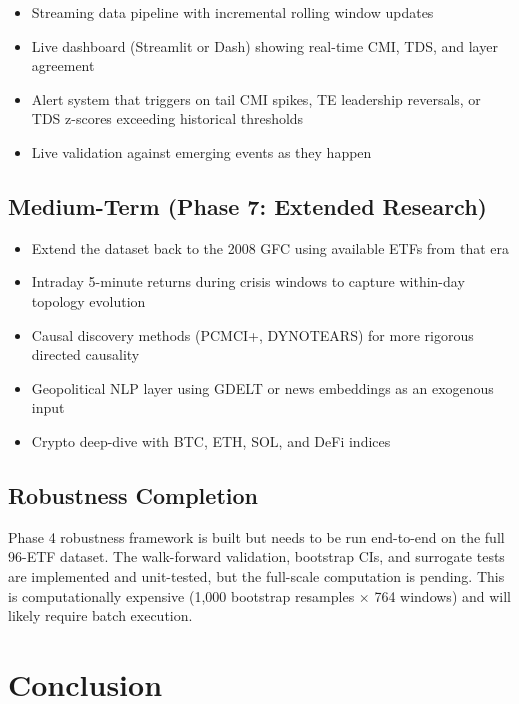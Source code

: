\documentclass[12pt, letterpaper]{article}
\begin{document}
\begin{itemize}
    \item Streaming data pipeline with incremental rolling window updates
    \item Live dashboard (Streamlit or Dash) showing real-time CMI, TDS, and layer agreement
    \item Alert system that triggers on tail CMI spikes, TE leadership reversals, or TDS z-scores exceeding historical thresholds
    \item Live validation against emerging events as they happen
\end{itemize}

\subsection{Medium-Term (Phase 7: Extended Research)}

\begin{itemize}
    \item Extend the dataset back to the 2008 GFC using available ETFs from that era
    \item Intraday 5-minute returns during crisis windows to capture within-day topology evolution
    \item Causal discovery methods (PCMCI+, DYNOTEARS) for more rigorous directed causality
    \item Geopolitical NLP layer using GDELT or news embeddings as an exogenous input
    \item Crypto deep-dive with BTC, ETH, SOL, and DeFi indices
\end{itemize}

\subsection{Robustness Completion}

Phase 4 robustness framework is built but needs to be run end-to-end on the full 96-ETF dataset. The walk-forward validation, bootstrap CIs, and surrogate tests are implemented and unit-tested, but the full-scale computation is pending. This is computationally expensive (1,000 bootstrap resamples $\times$ 764 windows) and will likely require batch execution.

\section{Conclusion}
\end{document}
